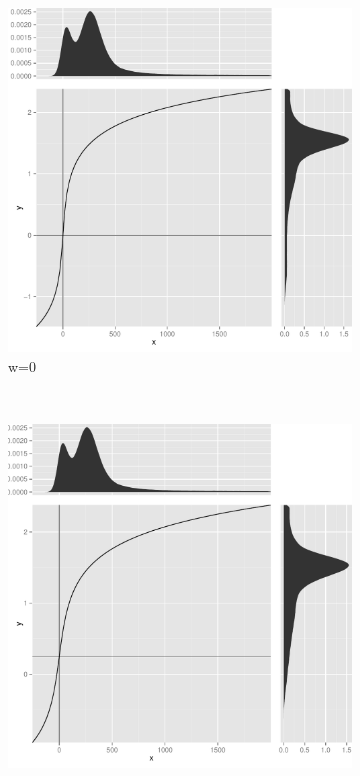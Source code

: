 \begin{figure}[h]
\centering
\begin{subfigure}[b]{.4\textwidth}
    \centering
    \includegraphics[scale=.3]{figures/logicle-transform-a.pdf}
    \caption{w=0}
\end{subfigure}
~
\begin{subfigure}[b]{.4\textwidth}
    \centering
    \includegraphics[scale=.3]{figures/logicle-transform-b.pdf}

\end{subfigure}
\end{figure}

